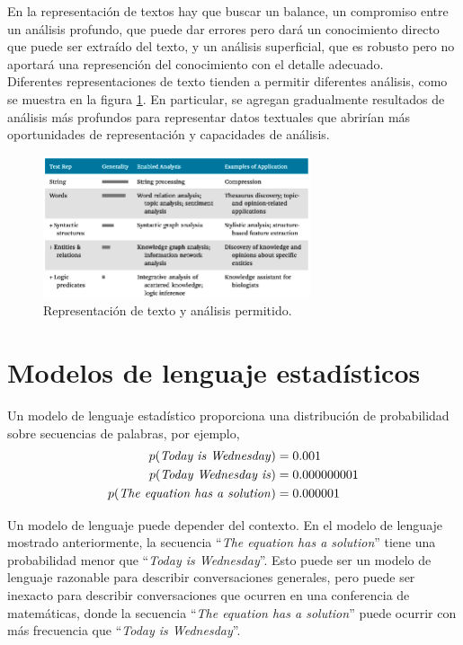 En la representación de textos hay que buscar un balance, un compromiso entre un análisis profundo, que puede dar errores pero dará un conocimiento directo que puede ser extraído del texto, y un análisis superficial, que es robusto pero no aportará una represención del conocimiento con el detalle adecuado. \\

Diferentes representaciones de texto tienden a permitir diferentes análisis, como se muestra en la figura \ref{fig:3.4}. En particular, se agregan gradualmente resultados de análisis más profundos para representar datos textuales que abrirían más oportunidades de representación y capacidades de análisis. 

\begin{figure}[h]
\centering
\includegraphics[width=0.7\textwidth]{fotos/8.png}
\caption{Representación de texto y análisis permitido.}
\label{fig:3.4}
\end{figure}

\section{Modelos de lenguaje estadísticos}

Un modelo de lenguaje estadístico proporciona una distribución de probabilidad sobre secuencias de palabras, por ejemplo, 
\begin{align*}
p(\text{\textit{Today is Wednesday}}) &= 0.001 \\
p(\text{\textit{Today Wednesday is}}) &= 0.000000001 \\
p(\text{\textit{The equation has a solution}}) &= 0.000001
\end{align*} 

Un modelo de lenguaje puede depender del contexto. En el modelo de lenguaje mostrado anteriormente, la secuencia ``\textit{The equation has a solution}'' tiene una probabilidad menor que ``\textit{Today is Wednesday}''. Esto puede ser un modelo de lenguaje razonable para describir conversaciones generales, pero puede ser inexacto para describir conversaciones que ocurren en una conferencia de matemáticas, donde la secuencia ``\textit{The equation has a solution}'' puede ocurrir con más frecuencia que ``\textit{Today is Wednesday}''. \\

